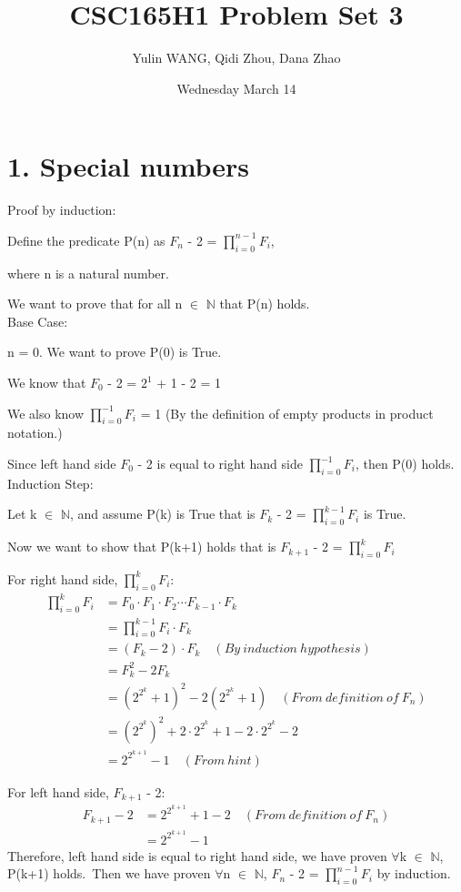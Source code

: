 \documentclass[12pt]{article}
\title{CSC165H1 Problem Set 3}
\author{Yulin WANG, Qidi Zhou, Dana Zhao}
\date{Wednesday March 14}
\begin{document}
\maketitle

\newpage
\section*{1. Special numbers} 
\vspace{20pt}
\vspace{20pt}

Proof by induction:

Define the predicate P(n) as $F_{n}$ - 2 = $\prod_{i=0}^{n-1}$$F_{i}$,

where n is a natural number.

We want to prove that for all n $\in$ $\mathbb{N}$ that P(n) holds.\\
Base Case:

n = 0. We want to prove P(0) is True.

We know that $F_{0}$ - 2 = $2^{1}$ + 1 - 2 = 1 

We also know $\prod_{i=0}^{-1}$$F_{i}$ = 1 (By the definition of empty products in product notation.)

Since left hand side $F_{0}$ - 2 is equal to right hand side $\prod_{i=0}^{-1}$$F_{i}$, then P(0) holds.\\
Induction Step:

Let k $\in$ $\mathbb{N}$, and assume P(k) is True that is  $F_{k}$ - 2 = $\prod_{i=0}^{k-1}$$F_{i}$ is True.

Now we want to show that P(k+1) holds that is  $F_{k+1}$ - 2 = $\prod_{i=0}^{k}$$F_{i}$

For right hand side,  $\prod_{i=0}^{k}$$F_{i}$:
\begin{align*}
 \prod_{i=0}^{k}F_{i} &= F_{0} \cdot F_{1} \cdot F_{2} \dotsb F_{k-1}\cdot F_{k}\\
&= \prod_{i=0}^{k-1}F_{i}  \cdot F_{k}\\
&= (F_{k} - 2) \cdot F_{k} \quad(By\ induction\ hypothesis)\\
&= F_{k}^{2} - 2F_{k}\\
&= (2^{2^{k}}+1)^{2} - 2(2^{2^{k}}+1)\quad(From \ definition \ of \ F_{n})\\
&= (2^{2^{k}})^{2} + 2 \cdot 2^{2^{k}} + 1-2 \cdot 2^{2^{k}}-2\\
&= 2^{2^{k+1}}-1\quad(From \ hint)
\end{align*}

For left hand side,  $F_{k+1}$ - 2:
\begin{align*}
F_{k+1} - 2 &= 2^{2^{k+1}}+1-2\quad(From \ definition \ of \ F_{n})\\
&= 2^{2^{k+1}}-1
\end{align*}
Therefore, left hand side is equal to right hand side, we have proven $\forall$k $\in$ $\mathbb{N}$, P(k+1) holds.\
Then we have proven $\forall$n $\in$ $\mathbb{N}$, $F_{n}$ - 2 = $\prod_{i=0}^{n-1}$$F_{i}$ by induction.
\end{document}
